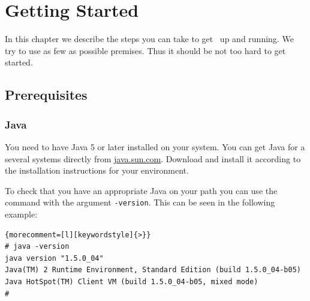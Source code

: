
\chapter{Getting Started}

In this chapter we describe the steps you can take to get \ExBib\ up
and running. We try to use as few as possible premises. Thus it should
be not too hard to get started.

\section{Prerequisites}

\subsection{Java}%

You need to have Java 5 or later installed on your system. You can get
Java for a several systems directly from \url{java.sun.com}. Download
and install it according to the installation instructions for your
environment.

To check that you have an appropriate Java on your path you can use
the command  with the argument \texttt{-version}. This
can be seen in the following example:

%
\begin{lstlisting}{morecomment=[l][keywordstyle]{>}}
# java -version
java version "1.5.0_04"
Java(TM) 2 Runtime Environment, Standard Edition (build 1.5.0_04-b05)
Java HotSpot(TM) Client VM (build 1.5.0_04-b05, mixed mode)
#
\end{lstlisting}

